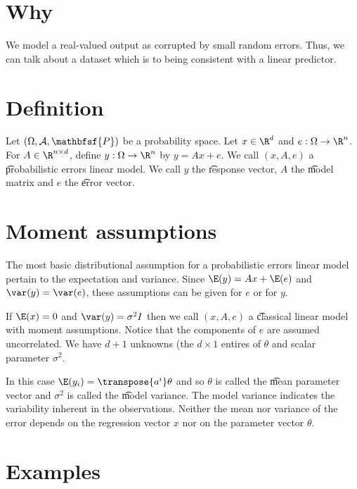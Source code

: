 

\section*{Why}

We model a real-valued output as corrupted by small random errors.
Thus, we can talk about a dataset which is  to being consistent with a linear predictor.

\section*{Definition}

Let $(\Omega , \mathcal{A} , \mathbfsf{P} )$ be a probability space.
Let $x \in \R ^d$ and $e: \Omega  \to \R ^n$.
For $A \in \R ^{n \times d}$, define $y: \Omega  \to \R ^n$ by $y = Ax + e$.
We call $(x, A, e)$ a \t{probabilistic errors linear model}.
We call $y$ the \t{response vector}, $A$ the \t{model matrix} and $e$ the \t{error vector}.

\section*{Moment assumptions}

The most basic distributional assumption for a probabilistic errors linear model pertain to the expectation and variance.
Since $\E (y) = Ax + \E (e)$ and $\var(y) = \var(e)$, these assumptions can be given for $e$ or for $y$.

If $\E (x) = 0$ and $\var(y) = \sigma ^2I$ then we call $(x, A, e)$ a \t{classical linear model with moment assumptions}.
Notice that the components of $e$ are assumed uncorrelated.
We have $d + 1$ unknowns (the $d \times 1$ entires of $\theta $ and scalar parameter $\sigma ^2$.

In this case $\E (y_i) = \transpose{a^i}\theta $ and so $\theta $ is called the \t{mean parameter vector} and $\sigma ^2$ is called the \t{model variance}.
The model variance indicates the variability inherent in the observations.
Neither the mean nor variance of the error depends on the regression vector $x$ nor on the parameter vector $\theta $.

\section*{Examples}

